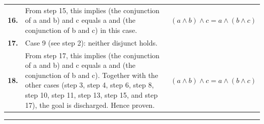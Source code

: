 \documentclass[11pt]{article}
\theoremstyle{definition}
\begin{document}
\begin{tabular}{@{} >{\raggedright\arraybackslash}p{} >{\raggedright\arraybackslash}p{} >{\raggedleft\arraybackslash}p{} @{}}
\textbf{16.} & From step 15, this implies (the conjunction of a and b) and c equals a and (the conjunction of b and c) in this case. & $\displaystyle (a \land b) \land c = a \land (b \land c)$ \\[0.45em]
\textbf{17.} & Case 9 (see step 2): neither disjunct holds. & \\[0.45em]
\textbf{18.} & From step 17, this implies (the conjunction of a and b) and c equals a and (the conjunction of b and c). Together with the other cases (step 3, step 4, step 6, step 8, step 10, step 11, step 13, step 15, and step 17), the goal is discharged. Hence proven. & $\displaystyle (a \land b) \land c = a \land (b \land c)$ \\[0.45em]
\bottomrule
\end{tabular}
\label{thm:Bool-conjunction-parentheses_do_not_matter}
\par\medskip\hrule
\end{document}
